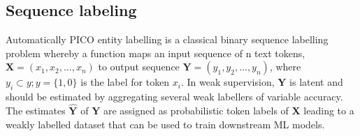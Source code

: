 \documentclass[10.7pt,]{article}
\begin{document}
\subsection{Sequence labeling}\label{seq_lab}
%
Automatically PICO entity labelling is a classical binary sequence labelling problem whereby a function maps an input sequence of n text tokens, $ \bm{X} = (x_{1}, x_{2}, \dotso , x_{n} )$ to output sequence $\bm{Y} = (y_{1}, y_{2}, \dotso , y_{n} )$, where $y_{i} \subset y; y = \{1,0\} $ is the label for token $x_{i}$.
In weak supervision, $\bm{Y}$ is latent and should be estimated by aggregating several weak labellers of variable accuracy.
The estimates $\bm{\hat{Y}}$ of $\bm{Y}$ are assigned as probabilistic token labels of $\bm{X}$ leading to a weakly labelled dataset that can be used to train downstream ML models.
%
%
%
\end{document}
